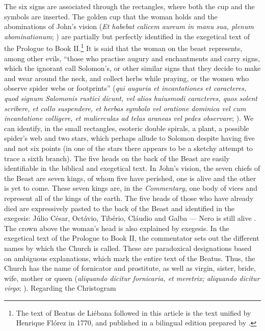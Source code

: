 \documentclass{article}
\begin{document}
 
The six signs are associated through the rectangles, where both the cup
and the symbols are inserted. The golden cup that the woman holds and
the abominations of John's vision (\emph{Et habebat calicem aureum in
manu sua, plenum abominationum}; \citealt[566]{gonzalez_echegaray_obras_1995})
are partially but perfectly identified in the exegetical text of the
Prologue to Book II.\footnote{The text of Beatus de Liébana followed in
  this article is the text unified by Henrique Flórez in 1770, and
  published in a bilingual edition prepared by \citet{gonzalez_echegaray_obras_1995}.} It is said that the woman on the beast represents, among
other evils, ``those who practise augury and enchantments and carry
signs, which the ignorant call Solomon's, or other similar signs that
they decide to make and wear around the neck, and collect herbs while
praying, or the women who observe spider webs or footprints'' (\emph{qui
auguria et incantationes et caracteres, quod signum Salomonis rustici
dicunt, vel alios huiusmodi caracteres, quos solent scribere, et collo
suspendere, et herbas symbolo vel oratione dominica vel cum incantatione
colligere, et mulierculas ad telas araneas vel pedes observare}; \citealt[162]{gonzalez_echegaray_obras_1995}). We can identify, in the small
rectangles, esoteric double spirals, a plant, a possible spider's web
and two stars, which perhaps allude to Solomon despite having five and
not six points (in one of the stars there appears to be a sketchy
attempt to trace a sixth branch). The five heads on the back of the
Beast are easily identifiable in the biblical and exegetical text. In
John's vision, the seven chiefs of the Beast are seven kings, of whom
five have perished, one is alive and the other is yet to come. These
seven kings are, in the \emph{Commentary}, one body of vices and
represent all of the kings of the earth. The five heads of those who
have already died are expressively pasted to the back of the Beast and
identified in the exegesis: Júlio César, Octávio, Tibério, Cláudio and
Galba –– Nero is still alive \citep[574]{gonzalez_echegaray_obras_1995}. The
crown above the woman's head is also explained by exegesis. In the
exegetical text of the Prologue to Book II, the commentator sets out the
different names by which the Church is called. These are paradoxical
designations based on ambiguous explanations, which mark the entire text
of the Beatus. Thus, the Church has the name of fornicator and
prostitute, as well as virgin, sister, bride, wife, mother or queen
(\emph{aliquando dicitur fornicaria, et meretrix; aliquando dicitur
virgo}; \citealt[164]{gonzalez_echegaray_obras_1995}). Regarding the Christogram
\end{document}
